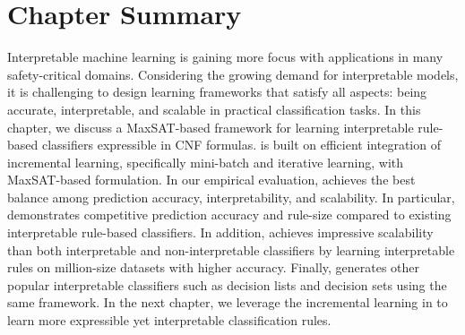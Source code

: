 
\section{Chapter Summary}
\label{interpretability_imli_sec:conclusion}
Interpretable machine learning is gaining more focus with applications in many safety-critical domains. Considering the growing demand for interpretable models, it is challenging to design learning frameworks that satisfy all aspects: being accurate, interpretable, and scalable in practical classification tasks.  In this chapter, we discuss a MaxSAT-based framework {\imli} for learning interpretable rule-based classifiers expressible in CNF formulas. {\imli} is built on efficient integration of incremental learning, specifically mini-batch and iterative learning, with MaxSAT-based formulation.  In our empirical evaluation, {\imli} achieves the best balance among prediction accuracy, interpretability, and scalability. In particular, {\imli} demonstrates competitive prediction accuracy and rule-size compared to existing interpretable rule-based classifiers. In addition, {\imli} achieves impressive scalability than both interpretable and non-interpretable classifiers by learning interpretable rules on million-size datasets with higher accuracy.  Finally, {\imli}  generates other popular interpretable classifiers such as decision lists and decision sets using the same framework. In the next chapter, we leverage the incremental learning in {\imli} to learn more expressible yet interpretable classification rules.


